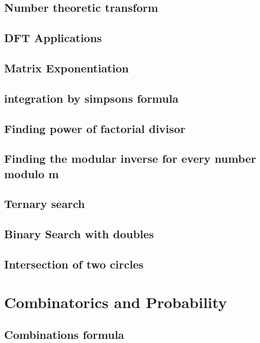\subsection{Number theoretic transform}
\subsection{DFT Applications}
\subsection{Matrix Exponentiation}
\subsection{integration by simpsons formula}
\subsection{Finding power of factorial divisor}
\subsection{Finding the modular inverse for every number modulo m}
\subsection{Ternary search}
\subsection{Binary Search with doubles}
\subsection{Intersection of two circles}

\section{Combinatorics and Probability}
\subsection{Combinations formula}
